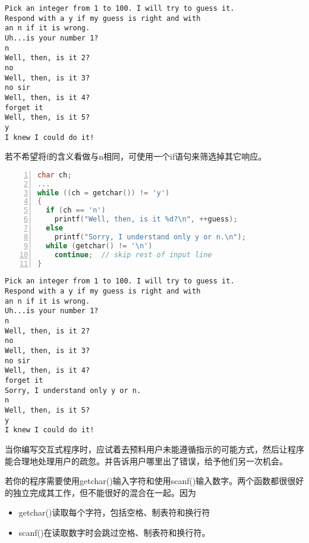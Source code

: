 \begin{frame}[fragile]\ft{\secname}
\begin{lstlisting}
Pick an integer from 1 to 100. I will try to guess it.
Respond with a y if my guess is right and with
an n if it is wrong.
Uh...is your number 1?
n
Well, then, is it 2?
no
Well, then, is it 3?
no sir
Well, then, is it 4?
forget it
Well, then, is it 5?
y
I knew I could do it!
\end{lstlisting}
\end{frame}

\begin{frame}[fragile]\ft{\secname}
若不希望将f的含义看做与n相同，可使用一个if语句来筛选掉其它响应。
\begin{lstlisting}[language=c,numbers=left,frame=single]
char ch;
...
while ((ch = getchar()) != 'y')
{
  if (ch == 'n')
    printf("Well, then, is it %d?\n", ++guess);
  else
    printf("Sorry, I understand only y or n.\n");
  while (getchar() != '\n')
    continue;  // skip rest of input line
}
\end{lstlisting}


\end{frame}

\begin{frame}[fragile]\ft{\secname}
\begin{lstlisting}
Pick an integer from 1 to 100. I will try to guess it.
Respond with a y if my guess is right and with
an n if it is wrong.
Uh...is your number 1?
n
Well, then, is it 2?
no
Well, then, is it 3?
no sir
Well, then, is it 4?
forget it
Sorry, I understand only y or n.
n
Well, then, is it 5?
y
I knew I could do it!
\end{lstlisting}

\end{frame}

\begin{frame}[fragile]\ft{\secname}
当你编写交互式程序时，应试着去预料用户未能遵循指示的可能方式，然后让程序能合理地处理用户的疏忽。并告诉用户哪里出了错误，给予他们另一次机会。
\end{frame}

\begin{frame}[fragile]
若你的程序需要使用{\tf getchar()}输入字符和使用{\tf scanf()}输入数字。两个函数都很很好的独立完成其工作，但不能很好的混合在一起。因为
\begin{itemize}
\item
{\tf getchar()}读取每个字符，包括空格、制表符和换行符
\item
{\tf scanf()}在读取数字时会跳过空格、制表符和换行符。
\end{itemize}
\end{frame}

